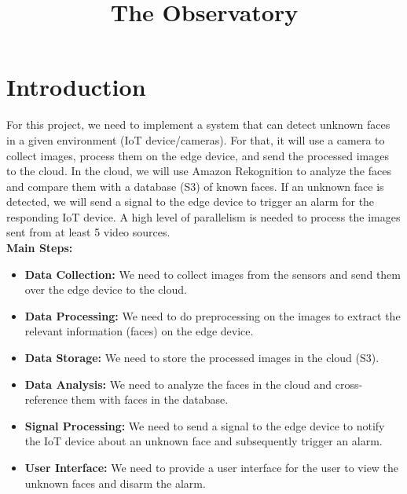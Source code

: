 \documentclass[conference]{IEEEtran}
\begin{document}
\title{The Observatory}

\author{
      \and
      \and
}

\maketitle

\section{Introduction}
For this project, we need to implement a system that can detect unknown faces in a given environment (IoT device/cameras).
For that, it will use a camera to collect images, process them on the edge device, and send the processed images to the cloud.
In the cloud, we will use Amazon Rekognition to analyze the faces and compare them with a database (S3) of known faces.
If an unknown face is detected, we will send a signal to the edge device to trigger an alarm for the responding IoT device.
A high level of parallelism is needed to process the images sent from at least 5 video sources.
\\
\textbf{Main Steps:}
\begin{itemize}
      \item \textbf{Data Collection:} We need to collect images from the sensors and send them over the edge device to the cloud.
      \item \textbf{Data Processing:} We need to do preprocessing on the images to extract the relevant information (faces) on the edge device.
      \item \textbf{Data Storage:} We need to store the processed images in the cloud (S3).
      \item \textbf{Data Analysis:} We need to analyze the faces in the cloud and cross-reference them with faces in the database.
      \item \textbf{Signal Processing:} We need to send a signal to the edge device to notify the IoT device about an unknown face and subsequently trigger an alarm.
      \item \textbf{User Interface:} We need to provide a user interface for the user to view the unknown faces and disarm the alarm.
\end{itemize}
\end{document}
